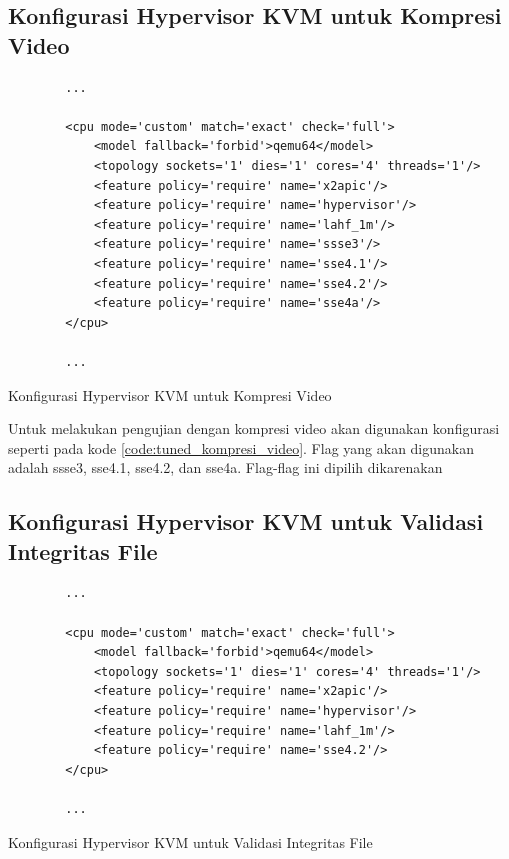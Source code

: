 \subsection{Konfigurasi Hypervisor KVM untuk Kompresi Video}
\begin{listing}[H]
    \begin{verbatim}
        ...

        <cpu mode='custom' match='exact' check='full'>
            <model fallback='forbid'>qemu64</model>
            <topology sockets='1' dies='1' cores='4' threads='1'/>
            <feature policy='require' name='x2apic'/>
            <feature policy='require' name='hypervisor'/> 
            <feature policy='require' name='lahf_1m'/>
            <feature policy='require' name='ssse3'/>
            <feature policy='require' name='sse4.1'/>
            <feature policy='require' name='sse4.2'/>
            <feature policy='require' name='sse4a'/>
        </cpu>
        
        ...
    \end{verbatim}
    \caption{Konfigurasi Hypervisor KVM untuk Kompresi Video}
    \label{code:tuned_kompresi_video}
\end{listing}

Untuk melakukan pengujian dengan kompresi video akan digunakan konfigurasi seperti pada kode \ref{code:tuned_kompresi_video}. Flag yang akan digunakan adalah ssse3, sse4.1, sse4.2, dan sse4a. Flag-flag ini dipilih dikarenakan 

\subsection{Konfigurasi Hypervisor KVM untuk Validasi Integritas File}
\begin{listing}[H]
    \begin{verbatim}
        ...

        <cpu mode='custom' match='exact' check='full'>
            <model fallback='forbid'>qemu64</model>
            <topology sockets='1' dies='1' cores='4' threads='1'/>
            <feature policy='require' name='x2apic'/>
            <feature policy='require' name='hypervisor'/> 
            <feature policy='require' name='lahf_1m'/>
            <feature policy='require' name='sse4.2'/>
        </cpu>
        
        ...
    \end{verbatim}
    \caption{Konfigurasi Hypervisor KVM untuk Validasi Integritas File}
    \label{code:tuned_validasi_integritas_file}
\end{listing}

